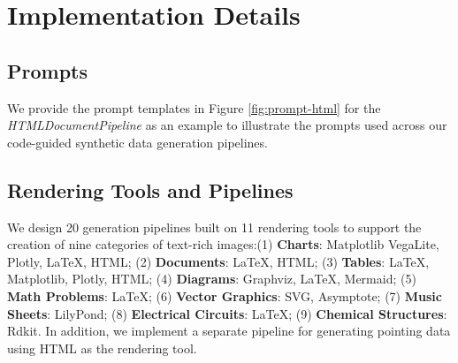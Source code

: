 \section{Implementation Details}
\subsection{Prompts}
We provide the prompt templates in Figure \ref{fig:prompt-html} for the \textit{HTMLDocumentPipeline} as an example to illustrate the prompts used across our code-guided synthetic data generation pipelines.


\subsection{Rendering Tools and Pipelines}
We design 20 generation pipelines built on 11 rendering tools to support the creation of nine categories of text-rich images:(1) \textbf{Charts}: Matplotlib VegaLite, Plotly, LaTeX, HTML;
(2) \textbf{Documents}: LaTeX, HTML;
(3) \textbf{Tables}: LaTeX, Matplotlib, Plotly, HTML;
(4) \textbf{Diagrams}: Graphviz, LaTeX, Mermaid;
(5) \textbf{Math Problems}: LaTeX;
(6) \textbf{Vector Graphics}: SVG, Asymptote;
(7) \textbf{Music Sheets}: LilyPond;
(8) \textbf{Electrical Circuits}: LaTeX;
(9) \textbf{Chemical Structures}: Rdkit. 
In addition, we implement a separate pipeline for generating pointing data using HTML as the rendering tool.


